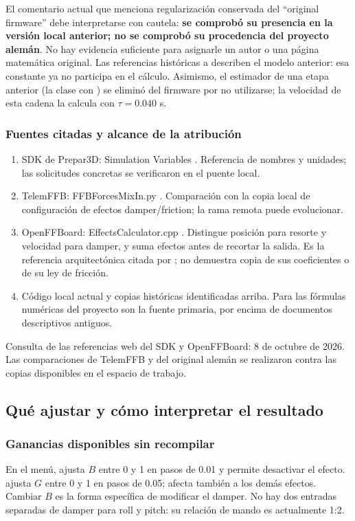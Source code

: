 El comentario actual que menciona regularización conservada del ``original firmware'' debe interpretarse con cautela: \textbf{se comprobó su presencia en la versión local anterior; no se comprobó su procedencia del proyecto alemán}. No hay evidencia suficiente para asignarle un autor o una página matemática original. Las referencias históricas a  describen el modelo anterior: esa constante ya no participa en el cálculo. Asimismo, el estimador de una etapa anterior (la clase  con ) se eliminó del firmware por no utilizarse; la velocidad de esta cadena la calcula  con $\tau=0.040$ s.

\subsubsection{Fuentes citadas y alcance de la atribución}
\begin{enumerate}
\item SDK de Prepar3D: Simulation Variables \cite{p3dv3}. Referencia de nombres y unidades; las solicitudes concretas se verificaron en el puente local.
\item TelemFFB: FFBForcesMixIn.py \cite{telemffb}. Comparación con la copia local de configuración de efectos damper/friction; la rama remota puede evolucionar.
\item OpenFFBoard: EffectsCalculator.cpp \cite{openffboard}. Distingue posición para resorte y velocidad para damper, y suma efectos antes de recortar la salida. Es la referencia arquitectónica citada por ; no demuestra copia de sus coeficientes o de su ley de fricción.
\item Código local actual y copias históricas identificadas arriba. Para las fórmulas numéricas del proyecto son la fuente primaria, por encima de documentos descriptivos antiguos.
\end{enumerate}
Consulta de las referencias web del SDK y OpenFFBoard: 8 de octubre de 2026. Las comparaciones de TelemFFB y del original alemán se realizaron contra las copias disponibles en el espacio de trabajo.

\subsection{Qué ajustar y cómo interpretar el resultado}
\subsubsection{Ganancias disponibles sin recompilar}
En el menú,  ajusta $B$ entre 0 y 1 en pasos de 0.01 y permite desactivar el efecto.  ajusta $G$ entre 0 y 1 en pasos de 0.05; afecta también a los demás efectos. Cambiar $B$ es la forma específica de modificar el damper. No hay dos entradas separadas de damper para roll y pitch: su relación de mando es actualmente 1:2.

